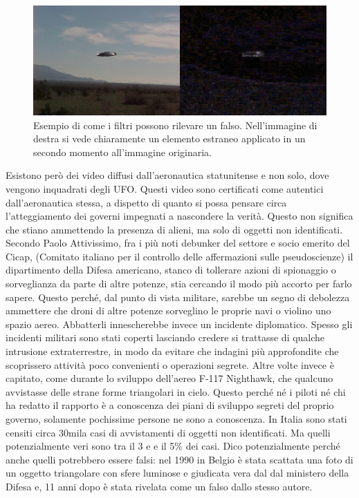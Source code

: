 \documentclass[12pt]{book} %
\begin{document}
\begin{mdframed}[linewidth=1pt]
\needspace{4cm}
\begin{figure}[H]
  \begin{minipage}{17cm}
    \includegraphics[width=17cm]{images/Libro-img053.jpg}
    \caption{Esempio di come i filtri possono rilevare un falso. Nell'immagine di destra si vede chiaramente un elemento estraneo applicato in un secondo momento all'immagine originaria.}
  \end{minipage}
\end{figure}

Esistono però dei video diffusi dall'aeronautica statunitense e non solo, dove vengono inquadrati
degli UFO. Questi video sono certificati come autentici dall'aeronautica stessa, a dispetto di
quanto si possa pensare circa l'atteggiamento dei governi impegnati a nascondere la verità. Questo
non significa che stiano ammettendo la presenza di alieni, ma solo di oggetti non identificati. Secondo Paolo
Attivissimo, fra i più noti debunker del settore e socio emerito del Cicap, (Comitato italiano per il controllo delle
affermazioni sulle pseudoscienze) il dipartimento della Difesa americano, stanco di tollerare azioni di spionaggio o
sorveglianza da parte di altre potenze, stia cercando il modo più accorto per farlo sapere. Questo perché, dal punto di
vista militare, sarebbe un segno di debolezza ammettere che droni di altre potenze sorveglino le proprie navi o violino
uno spazio aereo. Abbatterli innescherebbe invece un incidente diplomatico. Spesso gli incidenti militari sono stati
coperti lasciando credere si trattasse di qualche intrusione extraterrestre, in modo da evitare che indagini più
approfondite che scoprissero attività poco convenienti o operazioni segrete. Altre volte invece è capitato, come
durante lo sviluppo dell'aereo F-117 Nighthawk, che qualcuno avvistasse delle strane forme
triangolari in cielo. Questo perché né i piloti né chi ha redatto il rapporto è a conoscenza dei piani di sviluppo
segreti del proprio governo, solamente pochissime persone ne sono a conoscenza. In Italia sono stati censiti circa
30mila casi di avvistamenti di oggetti non identificati. Ma quelli potenzialmente veri sono tra il 3 e e il 5\% dei
casi. Dico potenzialmente perché anche quelli potrebbero essere falsi: nel 1990 in Belgio è stata scattata una foto di
un oggetto triangolare con sfere luminose e giudicata vera dal dal ministero della Difesa e, 11 anni dopo è stata
rivelata come un falso dallo stesso autore.



\end{mdframed}
\end{document}
